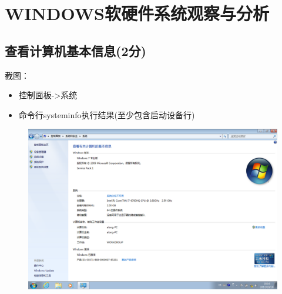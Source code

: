 \section{WINDOWS软硬件系统观察与分析}
\subsection{查看计算机基本信息(2分)}

截图：
\begin{itemize}
	\item 控制面板->系统
	\item 命令行systeminfo执行结果(至少包含启动设备行)
\end{itemize}

\begin{figure}[H]
	\begin{minipage}[c]{0.58\linewidth}
		\centering
		\includegraphics[width=\linewidth]{figures/Win-Ctl-System}
		\label{fig:win-ctl-system}
	\end{minipage}
	\begin{minipage}[c]{0.3\linewidth}
		\centering

\end{minipage}
\end{figure}
